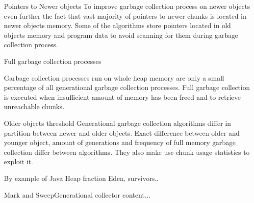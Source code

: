 \documentclass[presentation]{beamer}
\begin{document}
\begin{frame}{Pointers to Newer objects}
	To improve garbage collection process on newer objects even further the fact that vast majority of pointers to newer chunks is located in newer objects memory.
	Some of the algorithms store pointers located in old objects memory and program data to avoid scanning for them during garbage collection process.
\end{frame}

\begin{frame}{Full garbage collection processes}
	
	Garbage collection processes run on whole heap memory are only a small percentage of all generational garbage collection processes.
	Full garbage collection is executed when insufficient 
	amount of memory has been freed and to retrieve unreachable chunks.
\end{frame}

\begin{frame}{Older objects threshold}
	Generational garbage collection algorithms differ in partition between newer and older objects.
	Exact difference between older and younger object, amount of generations and frequency of full memory garbage collection differ between algorithms.
	They also make use chunk usage statistics to exploit it.
\end{frame}


\begin{frame}
By example of Java Heap fraction Eden, survivors..
\end{frame}

\begin{frame}{Mark and Sweep}{Generational collector}
content...
\end{frame}
\end{document}
